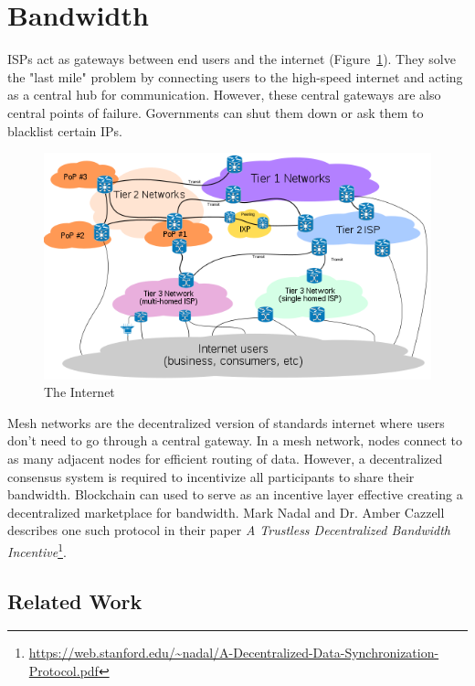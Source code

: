 \section{Bandwidth}
	ISPs act as gateways between end users and the internet (Figure~\ref{fig:internet-backbone}). They solve the "last mile" problem by connecting users to the high-speed internet and acting as a central hub for communication. However, these central gateways are also central points of failure. Governments can shut them down or ask them to blacklist certain IPs\cite{raval2016decentralized}.
	
	\begin{figure}[h]
		\includegraphics[width=\linewidth]{figures/internet-backbone}
		\caption{\label{fig:internet-backbone} The Internet\protect\footnotemark}
	\end{figure}
	
	Mesh networks are the decentralized version of standards internet where users don't need to go through a central gateway. In a mesh network, nodes connect to as many adjacent nodes for efficient routing of data. However, a decentralized consensus system is required to incentivize all participants to share their bandwidth. Blockchain can used to serve as an incentive layer effective creating a decentralized marketplace for bandwidth. Mark Nadal and Dr. Amber Cazzell describes one such protocol in their paper \textit{A Trustless Decentralized Bandwidth Incentive}\footnote{\url{https://web.stanford.edu/~nadal/A-Decentralized-Data-Synchronization-Protocol.pdf}}.
	
	\subsection{Related Work}
